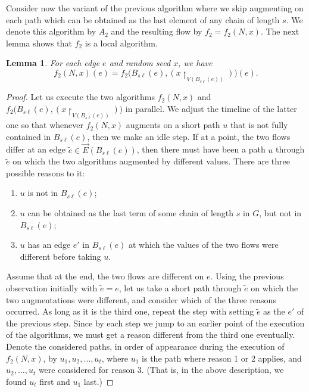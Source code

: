 \documentclass[12pt,a4paper]{article}
\newtheorem{Lemma}[Theorem]{Lemma}
\newcommand{\vE}{\vec{E}}
\renewcommand{\:}{\colon}
\begin{document}
Consider now the variant of the previous algorithm where we skip augmenting on each path which can be obtained as the last element of any chain of length $s$. 
We denote this algorithm by $A_2$ and the resulting flow by $f_2 = f_2(N, x)$. The next lemma shows that $f_2$ is a local algorithm.

\begin{Lemma} \label{f2local}
For each edge $e$ and random seed $x$, we have
\begin{equation*}
f_2(N, x)(e) = f_2 \big( B_{s\ell}(e), (x\upharpoonright_{V(B_{s\ell}(e))})\big)(e).
\end{equation*}
\end{Lemma}

\begin{proof}
Let us execute the two algorithms $f_2(N, x)$ and $f_2 \big( B_{s\ell}(e), (x\upharpoonright_{V(B_{s\ell}(e))})\big)$ in parallel. 
We adjust the timeline of the latter one so that whenever $f_2(N, x)$ augments on a short path $u$ that is not fully contained in $B_{s\ell}(e)$, then we make an idle step. 
If at a point, the two flows differ at an edge $\tilde{e} \in \vE(B_{s\ell}(e))$, then there must have been a path $u$ through $\tilde{e}$ on which the two algorithms augmented by different values. 
There are three possible reasons to it:
\begin{enumerate}
\item $u$ is not in $B_{s\ell}(e)$;
\item $u$ can be obtained as the last term of some chain of length $s$ in $G$, but not in $B_{s\ell}(e)$;
\item $u$ has an edge $e'$ in $B_{s\ell}(e)$ at which the values of the two flows were different before taking $u$.
\end{enumerate}

Assume that at the end, the two flows are different on $e$. 
Using the previous observation initially with $\tilde{e} = e$, let us take a short path through $\tilde{e}$ on which the two augmentations were different, and consider which of the three reasons occurred. 
As long as it is the third one, repeat the step with setting $\tilde{e}$ as the $e'$ of the previous step. 
Since by each step we jump to an earlier point of the execution of the algorithms, we must get a reason different from the third one eventually. 
Denote the considered paths, in order of appearance during the execution of $f_2(N, x)$, by $u_1, u_2, \ldots,  u_t$, where $u_1$ is the path where reason 1 or 2 applies, and $u_2, \ldots,  u_t$ were considered for reason 3. 
(That is, in the above description, we found $u_t$ first and $u_1$ last.)



\end{proof}
\end{document}
